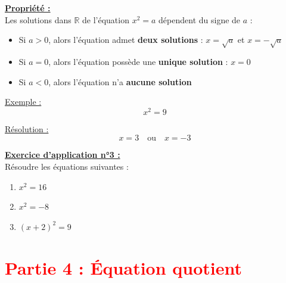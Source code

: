 \documentclass[12pt]{article}
\begin{document}
\begin{mdframed}[
    linewidth=1pt,
    roundcorner=5pt,
    linecolor=Red,
    innertopmargin=10pt,
    innerbottommargin=10pt
]
{\color{red}\underline{\textbf{Propriété :}}
\vspace{5pt}\\
Les solutions dans $\mathbb{R}$ de l'équation $x^2 = a$ dépendent du signe de $a$ :
\begin{itemize}
    \item Si $a > 0$, alors l'équation admet \textbf{deux solutions} :  
    $x = \sqrt{a}$ et $x = -\sqrt{a}$
    \item Si $a = 0$, alors l'équation possède une \textbf{unique solution} : $x = 0$
    \item Si $a < 0$, alors l'équation n'a \textbf{aucune solution}
\end{itemize}
}
\end{mdframed}

\vspace{10pt}

\underline{Exemple :}
\[
x^2 = 9
\]

\vspace{5pt}

\underline{Résolution :}
\[
x = 3 \quad \text{ou} \quad x = -3
\]

\vspace{10pt}

\begin{mdframed}[
    linewidth=1pt,
    roundcorner=5pt,
    linecolor=RoyalBlue,
    innertopmargin=10pt,
    innerbottommargin=10pt
]
{\color{RoyalBlue}\textbf{\underline{Exercice d'application n°3 :}}}
\vspace{5pt}
\\
Résoudre les équations suivantes :
\begin{enumerate}
    \item $x^2 = 16$
    \item $x^2 = -8$
    \item $(x+2)^2 = 9$
\end{enumerate}
\end{mdframed}


\section*{\textcolor{red}{Partie 4 : Équation quotient}}
\end{document}
